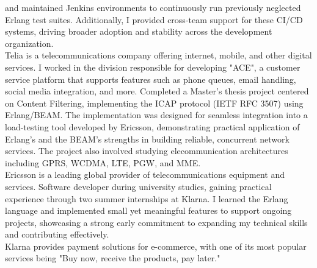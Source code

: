 \documentclass[purpleprocv]{procv}
\begin{document}
\begin{procv-twocolumns}
{{          and maintained Jenkins environments to continuously run previously neglected Erlang test suites. Additionally, I 
          provided cross-team support for these CI/CD systems, driving 
          broader adoption and stability across the development organization.
          \\[3pt]
          Telia is a telecommunications company offering internet, mobile, and other digital services. I worked 
          in the division responsible for developing "ACE", a customer service platform that supports features 
          such as phone queues, email handling, social media integration, and more.}
          {Completed a Master’s thesis project centered on Content Filtering, implementing the ICAP protocol (IETF RFC 3507) 
          using Erlang/BEAM. The implementation was designed for seamless integration into a load-testing tool developed by 
          Ericsson, demonstrating practical application of Erlang’s and the BEAM’s strengths in building reliable, concurrent 
          network services. The project also involved studying elecommunication architectures including GPRS, WCDMA, 
          LTE, PGW, and MME.
          \\[3pt]
          Ericsson is a leading global provider of telecommunications equipment and services.}
          {Software developer during university studies, gaining practical experience through two summer internships at Klarna. I learned the
          Erlang language and implemented small yet meaningful features to support ongoing projects, showcasing 
          a strong early commitment to expanding my technical skills and contributing effectively.
          \\[3pt]
          Klarna provides payment solutions for e-commerce, with one of its most popular services being 
          "Buy now, receive the products, pay later."}
        }
\end{procv-twocolumns}
\end{document}

